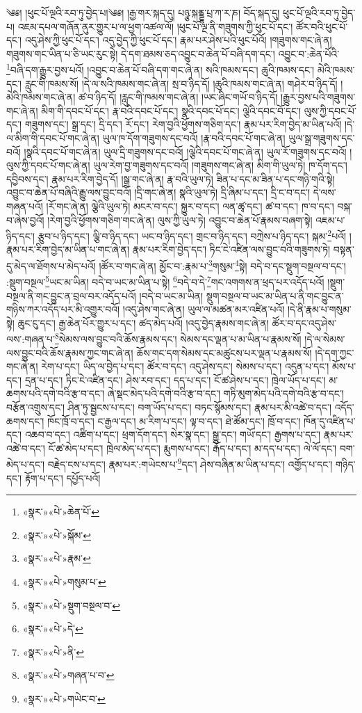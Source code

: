 ༄༅། །ཕུང་པོ་ལྔའི་རབ་ཏུ་བྱེད་པ།༄༅། །རྒྱ་གར་སྐད་དུ། པཉྩ་སྐནྡྷ་པྲ་ཀ་ར་ཎ། བོད་སྐད་དུ། ཕུང་པོ་ལྔའི་རབ་ཏུ་བྱེད་པ། འཇམ་དཔལ་གཞོན་ནུར་གྱུར་པ་ལ་ཕྱག་འཚལ་ལོ། །ཕུང་པོ་ལྔ་ནི་གཟུགས་ཀྱི་ཕུང་པོ་དང་། ཚོར་བའི་ཕུང་པོ་དང་། འདུ་ཤེས་ཀྱི་ཕུང་པོ་དང་། འདུ་བྱེད་ཀྱི་ཕུང་པོ་དང་། རྣམ་པར་ཤེས་པའི་ཕུང་པོའོ། །གཟུགས་གང་ཞེ་ན། གཟུགས་གང་ཡིན་པ་ཅི་ཡང་རུང་སྟེ། དེ་དག་ཐམས་ཅད་འབྱུང་བ་ཆེན་པོ་བཞི་དག་དང་། འབྱུང་བ་:ཆེན་པོའི་\footnote{«སྣར་»«པེ་»ཆེན་པོ་}བཞི་དག་རྒྱུར་བྱས་པའོ། །འབྱུང་བ་ཆེན་པོ་བཞི་དག་གང་ཞེ་ན། སའི་ཁམས་དང་། ཆུའི་ཁམས་དང་། མེའི་ཁམས་དང་། རླུང་གི་ཁམས་སོ། །དེ་ལ་སའི་ཁམས་གང་ཞེ་ན། སྲ་བ་ཉིད་དོ། །ཆུའི་ཁམས་གང་ཞེ་ན། གཤེར་བ་ཉིད་དོ། །མེའི་ཁམས་གང་ཞེ་ན། ཚ་བ་ཉིད་དོ། །རླུང་གི་ཁམས་གང་ཞེ་ན། །ཡང་ཞིང་གཡོ་བ་ཉིད་དོ། །རྒྱུར་བྱས་པའི་གཟུགས་གང་ཞེ་ན། མིག་གི་དབང་པོ་དང་། རྣ་བའི་དབང་པོ་དང་། སྣའི་དབང་པོ་དང་། ལྕེའི་དབང་བོ་དང་། ལུས་ཀྱི་དབང་པོ་དང་། གཟུགས་དང་། སྒྲ་དང་། དྲི་དང་། རོ་དང་། རེག་བྱའི་ཕྱོགས་གཅིག་དང་། རྣམ་པར་རིག་བྱེད་མ་ཡིན་པའོ། །དེ་ལ་མིག་གི་དབང་པོ་གང་ཞེ་ན། ཡུལ་ཁ་དོག་གཟུགས་དང་བའོ། །རྣ་བའི་དབང་པོ་གང་ཞེ་ན། ཡུལ་སྒྲ་གཟུགས་དང་བའོ། །སྣའི་དབང་པོ་གང་ཞེ་ན། ཡུལ་དྲི་གཟུགས་དང་བའོ། །ལྕེའི་དབང་པོ་གང་ཞེ་ན། ཡུལ་རོ་གཟུགས་དང་བའོ། །ལུས་ཀྱི་དབང་པོ་གང་ཞེ་ན། ཡུལ་རེག་བྱ་གཟུགས་དང་བའོ། །གཟུགས་གང་ཞེ་ན། མིག་གི་ཡུལ་ཏེ། ཁ་དོག་དང་། དབྱིབས་དང་། རྣམ་པར་རིག་བྱེད་དོ། །སྒྲ་གང་ཞེ་ན། རྣ་བའི་ཡུལ་ཏེ། ཟིན་པ་དང་མ་ཟིན་པ་དང་གཉི་གའི་སྟེ། འབྱུང་བ་ཆེན་པོ་བཞིའི་རྒྱུ་ལས་བྱུང་བའོ། །དྲི་གང་ཞེ་ན། སྣའི་ཡུལ་ཏེ། དྲི་ཞིམ་པ་དང་། དྲི་ང་བ་དང་། དེ་ལས་གཞན་པའོ། །རོ་གང་ཞེ་ན། ལྕེའི་ཡུལ་ཏེ། མངར་བ་དང་། སྐྱུར་བ་དང་། ལན་ཚྭ་དང་། ཚ་བ་དང་། ཁ་བ་དང་། བསྐ་བ་ཞེས་བྱའོ། །རེག་བྱའི་ཕྱོགས་གཅིག་གང་ཞེ་ན། ལུས་ཀྱི་ཡུལ་ཏེ། འབྱུང་བ་ཆེན་པོ་རྣམས་བཞག་སྟེ། འཇམ་པ་ཉིད་དང་། རྩུབ་པ་ཉིད་དང་། ལྕི་བ་ཉིད་དང་། ཡང་བ་ཉིད་དང་། གྲང་བ་ཉིད་དང་། བཀྲེས་པ་ཉིད་དང་། སྐམ་\footnote{«སྣར་»«པེ་»སྐོམ་}པའོ། །རྣམ་པར་རིག་བྱེད་མ་ཡིན་པ་གང་ཞེ་ན། རྣམ་པར་རིག་བྱེད་དང་། ཏིང་ངེ་འཛིན་ལས་བྱུང་བའི་གཟུགས་ཏེ། བསྟན་དུ་མེད་ལ་ཐོགས་པ་མེད་པའོ། །ཚོར་བ་གང་ཞེ་ན། མྱོང་བ་:རྣམ་པ་\footnote{«སྣར་»«པེ་»རྣམ་}གསུམ་\footnote{«སྣར་»«པེ་»གསུམ་པ་}སྟེ། བདེ་བ་དང་སྡུག་བསྔལ་བ་དང་། :སྡུག་བསྔལ་\footnote{«སྣར་»«པེ་»སྡུག་བསྔལ་བ་}ཡང་མ་ཡིན། བདེ་བ་ཡང་མ་ཡིན་པ་སྟེ། \footnote{«སྣར་»«པེ་»དེ་}བདེ་བ་དེ་\footnote{«སྣར་»«པེ་»ནི་}གང་འགགས་ན་ཕྲད་པར་འདོད་པའོ། །སྡུག་བསྔལ་ནི་གང་བྱུང་ན་བྲལ་བར་འདོད་པའོ། །བདེ་བ་ཡང་མ་ཡིན། སྡུག་བསྔལ་བ་ཡང་མ་ཡིན་པ་ནི་གང་བྱུང་ན་གཉིས་ཀར་འདོད་པར་མི་འགྱུར་བའོ། །འདུ་ཤེས་གང་ཞེ་ན། ཡུལ་ལ་མཚན་མར་འཛིན་པའོ། །དེ་ནི་རྣམ་པ་གསུམ་སྟེ། ཆུང་ངུ་དང་། རྒྱ་ཆེན་པོར་གྱུར་པ་དང་། ཚད་མེད་པའོ། །འདུ་བྱེད་རྣམས་གང་ཞེ་ན། ཚོར་བ་དང་འདུ་ཤེས་ལས་:གཞན་པ་\footnote{«སྣར་»«པེ་»གཞན་པ་བ་}སེམས་ལས་བྱུང་བའི་ཆོས་རྣམས་དང་། སེམས་དང་ལྡན་པ་མ་ཡིན་པ་རྣམས་སོ། །དེ་ལ་སེམས་ལས་བྱུང་བའི་ཆོས་རྣམས་ཀྱང་གང་ཞེ་ན། ཆོས་གང་དག་སེམས་དང་མཚུངས་པར་ལྡན་པ་རྣམས་སོ། །དེ་དག་ཀྱང་གང་ཞེ་ན། རེག་པ་དང་། ཡིད་ལ་བྱེད་པ་དང་། ཚོར་བ་དང་། འདུ་ཤེས་དང་། སེམས་པ་དང་། འདུན་པ་དང་། མོས་པ་དང་། དྲན་པ་དང་། ཏིང་ངེ་འཛིན་དང་། ཤེས་རབ་དང་། དད་པ་དང་། ངོ་ཚ་ཤེས་པ་དང་། ཁྲེལ་ཡོད་པ་དང་། མ་ཆགས་པའི་དགེ་བའི་རྩ་བ་དང་། ཞེ་སྡང་མེད་པའི་དགེ་བའི་རྩ་བ་དང་། གཏི་མུག་མེད་པའི་དགེ་བའི་རྩ་བ་དང་། བརྩོན་འགྲུས་དང་། ཤིན་ཏུ་སྦྱངས་པ་དང་། བག་ཡོད་པ་དང་། བཏང་སྙོམས་དང་། རྣམ་པར་མི་འཚེ་བ་དང་། འདོད་ཆགས་དང་། ཁོང་ཁྲོ་བ་དང་། ང་རྒྱལ་དང་། མ་རིག་པ་དང་། ལྟ་བ་དང་། ཐེ་ཚོམ་དང་། ཁྲོ་བ་དང་། ཁོན་དུ་འཛིན་པ་དང་། འཆབ་བ་དང་། འཚིག་པ་དང་། ཕྲག་དོག་དང་། སེར་སྣ་དང་། སྒྱུ་དང་། གཡོ་དང་། རྒྱགས་པ་དང་། རྣམ་པར་འཚེ་བ་དང་། ངོ་ཚ་མེད་པ་དང་། ཁྲེལ་མེད་པ་དང་། རྨུགས་པ་དང་། རྒོད་པ་དང་། མ་དད་པ་དང་། ལེ་ལོ་དང་། བག་མེད་པ་དང་། བརྗེད་ངས་པ་དང་། རྣམ་པར་:གཡེངས་པ་\footnote{«སྣར་»«པེ་»གཡེང་བ་}དང་། ཤེས་བཞིན་མ་ཡིན་པ་དང་། འགྱོད་པ་དང་། གཉིད་དང་། རྟོག་པ་དང་། དཔྱོད་པའོ། 
